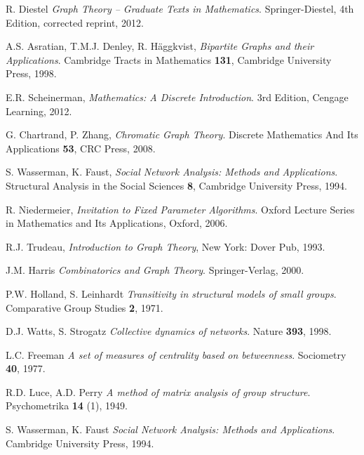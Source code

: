 \cleardoublepage
{}
{}
\begin{thebibliography}{99}

    R. Diestel
    \emph{Graph Theory -- Graduate Texts in Mathematics}.
    Springer-Diestel,
    4th Edition, corrected reprint,
    2012.

  A.S. Asratian, T.M.J. Denley, R. Häggkvist,
  \emph{Bipartite Graphs and their Applications}.
  Cambridge Tracts in Mathematics \textbf{131},
  Cambridge University Press,
  1998.

  E.R. Scheinerman, 
  \emph{Mathematics: A Discrete Introduction}.
  3rd Edition,
  Cengage Learning,
  2012.

  G. Chartrand, P. Zhang,
  \emph{Chromatic Graph Theory}.
  Discrete Mathematics And Its Applications \textbf{53},
  CRC Press,
  2008.

  S. Wasserman, K. Faust,
  \emph{Social Network Analysis: Methods and Applications}.
  Structural Analysis in the Social Sciences \textbf{8},
  Cambridge University Press,
  1994.

  R. Niedermeier,
  \emph{Invitation to Fixed Parameter Algorithms}.
  Oxford Lecture Series in Mathematics and Its Applications,
  Oxford,
  2006.

  R.J. Trudeau,
  \emph{Introduction to Graph Theory},
  New York: Dover Pub,
  1993.

  J.M. Harris
  \emph{Combinatorics and Graph Theory}.
  Springer-Verlag,
  2000.
  
  P.W. Holland, S. Leinhardt
  \emph{Transitivity in structural models of small groups}.
  Comparative Group Studies \textbf{2},
  1971.

  D.J. Watts, S. Strogatz
  \emph{Collective dynamics of  networks}.
  Nature \textbf{393},
  1998.
  
  L.C. Freeman
  \emph{A set of measures of centrality based on betweenness}.
  Sociometry \textbf{40},
  1977.

  R.D. Luce, A.D. Perry
  \emph{A method of matrix analysis of group structure}.
  Psychometrika \textbf{14} (1),
  1949.

  S. Wasserman, K. Faust
  \emph{Social Network Analysis: Methods and Applications}.
  Cambridge University Press,
  1994.


\end{thebibliography}
